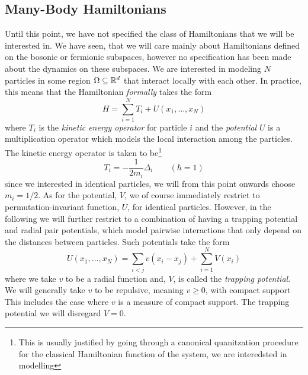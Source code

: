 \subsection{Many-Body Hamiltonians}
Until this point, we have not specified the class of Hamiltonians that we will be interested in. We have seen, that we will care mainly about Hamiltonians defined on the bosonic or fermionic subspaces, however no specification has been made about the dynamics on these subspaces. We are interested in modeling $ N $ particles in some region $ \Omega\subseteq\mathbb{R}^d $ that interact locally with each other. In practice, this means that the Hamiltonian \emph{formally} takes the form \begin{equation}
H=\sum_{i=1}^{N}T_i+U(x_1,\ldots,x_N)
\end{equation}
where $ T_i $ is the \emph{kinetic energy operator} for particle $ i $ and the \emph{potential} $ U $ is a multiplication operator which models the local interaction among the particles. The kinetic energy operator is taken to be\footnote{This is usually justified by going through a canonical quanitzation procedure for the classical Hamiltonian function of the system, we are interedsted in modelling} \begin{equation}
T_i=-\frac{1}{2m_i}\Delta_i\qquad (\hbar=1)
\end{equation} 
since we interested in identical particles, we will from this point onwards choose $ m_i=1/2 $. As for the potential, $ V $, we of course immediately restrict to permutation-invariant function, $ U $, for identical particles. However, in the following we will further restrict to a combination of having a trapping potential and radial pair potentials, which model pairwise interactions that only depend on the distances between particles. Such potentials take the form \begin{equation}
U(x_1,\ldots,x_N)=\sum_{i<j} v(x_i-x_j) + \sum_{i=1}^{N}V(x_i)
\end{equation}
where we take $ v $ to be a radial function and, $ V $, is called the \emph{trapping potential}. We will generally take $ v $ to be repulsive, meaning $ v\geq 0 $, with compact support This includes the case where $ v $ is a measure of compact support. The trapping potential we will disregard \ie $ V=0 $.

